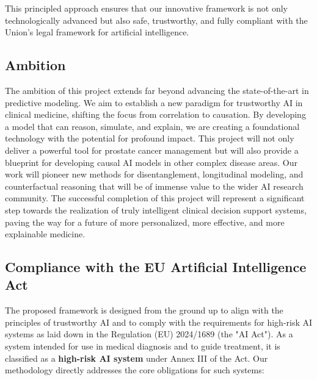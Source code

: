 \documentclass[11pt, a4paper]{article}
\begin{document}
This principled approach ensures that our innovative framework is not only technologically advanced but also safe, trustworthy, and fully compliant with the Union's legal framework for artificial intelligence.

\subsection{Ambition}
The ambition of this project extends far beyond advancing the state-of-the-art in predictive modeling. We aim to establish a new paradigm for trustworthy AI in clinical medicine, shifting the focus from correlation to causation. By developing a model that can reason, simulate, and explain, we are creating a foundational technology with the potential for profound impact. This project will not only deliver a powerful tool for prostate cancer management but will also provide a blueprint for developing causal AI models in other complex disease areas. Our work will pioneer new methods for disentanglement, longitudinal modeling, and counterfactual reasoning that will be of immense value to the wider AI research community. The successful completion of this project will represent a significant step towards the realization of truly intelligent clinical decision support systems, paving the way for a future of more personalized, more effective, and more explainable medicine.

\subsection{Compliance with the EU Artificial Intelligence Act}
The proposed framework is designed from the ground up to align with the principles of trustworthy AI and to comply with the requirements for high-risk AI systems as laid down in the Regulation (EU) 2024/1689 (the "AI Act"). As a system intended for use in medical diagnosis and to guide treatment, it is classified as a \textbf{high-risk AI system} under Annex III of the Act. Our methodology directly addresses the core obligations for such systems:
\end{document}
